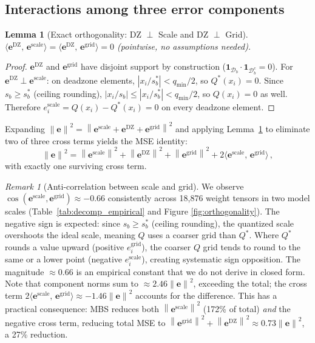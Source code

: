 \documentclass{article}
\newtheorem{lemma}[theorem]{Lemma}
\theoremstyle{definition}
\theoremstyle{remark}
\newtheorem{remark}[theorem]{Remark}
\newcommand{\Ind}{\mathbf{1}}
\newcommand{\cD}{\mathcal{D}}
\newcommand{\be}{\bm{e}}
\newcommand{\norm}[1]{\left\|#1\right\|}
\newcommand{\inner}[2]{\langle #1,\, #2 \rangle}
\begin{document}
\subsection{Interactions among three error components}
\label{sec:identity}

\begin{lemma}[Exact orthogonality: DZ $\perp$ Scale and DZ $\perp$ Grid]
\label{lem:exact}
$\inner{\be^{\mathrm{DZ}}}{\be^{\mathrm{scale}}} = \inner{\be^{\mathrm{DZ}}}{\be^{\mathrm{grid}}} = 0$ (pointwise, no assumptions needed).
\end{lemma}
\begin{proof}
$\be^{\mathrm{DZ}}$ and $\be^{\mathrm{grid}}$ have disjoint support by construction ($\Ind_{\cD_b}\cdot\Ind_{\cD_b^c} = 0$). For $\be^{\mathrm{DZ}} \perp \be^{\mathrm{scale}}$: on deadzone elements, $|x_i/s_b^*| < q_{\min}/2$, so $Q^*(x_i) = 0$. Since $s_b \geq s_b^*$ (ceiling rounding), $|x_i/s_b| \leq |x_i/s_b^*| < q_{\min}/2$, so $Q(x_i) = 0$ as well. Therefore $e_i^{\mathrm{scale}} = Q(x_i) - Q^*(x_i) = 0$ on every deadzone element.
\end{proof}

Expanding $\norm{\be}^2 = \norm{\be^{\mathrm{scale}} + \be^{\mathrm{DZ}} + \be^{\mathrm{grid}}}^2$ and applying Lemma~\ref{lem:exact} to eliminate two of three cross terms yields the MSE identity:
\begin{equation}
\label{eq:identity}
  \boxed{\norm{\be}^2
  = \norm{\be^{\mathrm{scale}}}^2
  + \norm{\be^{\mathrm{DZ}}}^2
  + \norm{\be^{\mathrm{grid}}}^2
  + 2\inner{\be^{\mathrm{scale}}}{\be^{\mathrm{grid}}}}\,,
\end{equation}
with exactly one surviving cross term.

\begin{remark}[Anti-correlation between scale and grid]
\label{rem:anticorr}
We observe $\cos(\be^{\mathrm{scale}}, \be^{\mathrm{grid}}) \approx -0.66$ consistently across 18{,}876 weight tensors in two model scales (Table~\ref{tab:decomp_empirical} and Figure \ref{fig:orthogonality}). The negative sign is expected: since $s_b \geq s_b^*$ (ceiling rounding), the quantized scale overshoots the ideal scale, meaning $Q$ uses a coarser grid than $Q^*$. Where $Q^*$ rounds a value upward (positive $e_i^{\mathrm{grid}}$), the coarser $Q$ grid tends to round to the same or a lower point (negative $e_i^{\mathrm{scale}}$), creating systematic sign opposition. The magnitude ${\approx}0.66$ is an empirical constant that we do not derive in closed form. Note that component norms sum to ${\approx}2.46\norm{\be}^2$, exceeding the total; the cross term $2\inner{\be^{\mathrm{scale}}}{\be^{\mathrm{grid}}} \approx -1.46\norm{\be}^2$ accounts for the difference. This has a practical consequence: MBS reduces both $\norm{\be^{\mathrm{scale}}}^2$ (172\% of total) \emph{and} the negative cross term, reducing total MSE to $\norm{\be^{\mathrm{grid}}}^2 + \norm{\be^{\mathrm{DZ}}}^2 \approx 0.73\norm{\be}^2$, a 27\% reduction.
\end{remark}
\end{document}
